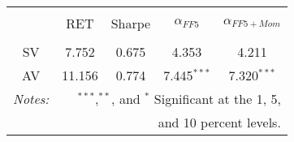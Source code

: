 \begin{table}[!htbp]
\begin{adjustbox}{width=\textwidth,max height=.45\totalheight}
%		
%		
%		
%		
	\end{adjustbox}
	\begin{adjustbox}{width=\textwidth,max height=.4\totalheight}
		\begin{tabular}{ccccc}
			\hline \\[-1.8ex] 
			&RET & Sharpe & $\alpha_{FF5}$ & $\alpha_{FF5+Mom}$\\
			\hline\\[-1.8ex]
			SV &7.752 & 0.675 &  4.353 & 4.211 \\
			AV &11.156 & 0.774 & 7.445$^{***}$ & 7.320$^{***}$ \\
		\hline
		\textit{Notes:} & \multicolumn{4}{r}{$^{***}$,$^{**}$, and $^{*}$ Significant at the 1, 5,}\\
		& &  \multicolumn{3}{r}{and 10 percent levels.}
	\end{tabular}
	\end{adjustbox}
\end{table}
%	
%	
\clearpage
